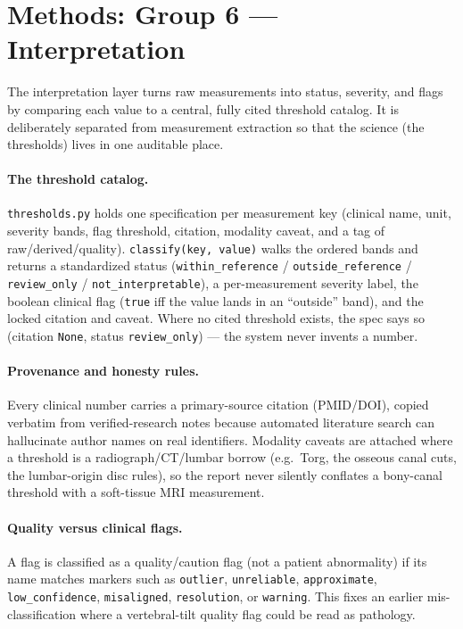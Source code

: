 \section{Methods: Group 6 --- Interpretation}
\label{sec:g6}

The interpretation layer turns raw measurements into status, severity, and flags by comparing each value
to a central, fully cited threshold catalog. It is deliberately separated from measurement extraction so
that the science (the thresholds) lives in one auditable place.

\paragraph{The threshold catalog.} \texttt{thresholds.py} holds one specification per measurement key
(clinical name, unit, severity bands, flag threshold, citation, modality caveat, and a tag of
raw/derived/quality). \texttt{classify(key, value)} walks the ordered bands and returns a standardized
status (\texttt{within\_reference} / \texttt{outside\_reference} / \texttt{review\_only} /
\texttt{not\_interpretable}), a per-measurement severity label, the boolean clinical flag
(\texttt{true} iff the value lands in an ``outside'' band), and the locked citation and caveat. Where no
cited threshold exists, the spec says so (citation \texttt{None}, status \texttt{review\_only}) --- the
system never invents a number.

\paragraph{Provenance and honesty rules.} Every clinical number carries a primary-source citation
(PMID/DOI), copied verbatim from verified-research notes because automated literature search can
hallucinate author names on real identifiers. Modality caveats are attached where a threshold is a
radiograph/CT/lumbar borrow (e.g.\ Torg, the osseous canal cuts, the lumbar-origin disc rules), so the
report never silently conflates a bony-canal threshold with a soft-tissue MRI measurement.

\paragraph{Quality versus clinical flags.} A flag is classified as a quality/caution flag (not a patient
abnormality) if its name matches markers such as \texttt{outlier}, \texttt{unreliable},
\texttt{approximate}, \texttt{low\_confidence}, \texttt{misaligned}, \texttt{resolution}, or
\texttt{warning}. This fixes an earlier mis-classification where a vertebral-tilt quality flag could be
read as pathology.

